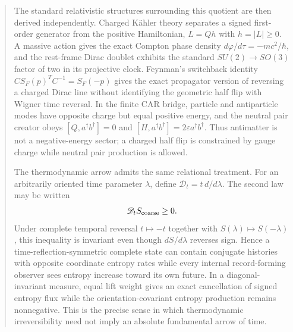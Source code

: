 \documentclass[11pt]{article}
\theoremstyle{definition}\newtheorem{definition}[theorem]{Definition}
\theoremstyle{remark}\newtheorem{remark}[theorem]{Remark}\newtheorem{conjecture}[theorem]{Conjecture}
\begin{document}
\begin{abstract}
The standard relativistic structures surrounding this quotient are then derived independently. Charged K\"ahler theory separates a signed first-order generator from the positive Hamiltonian, $L=Qh$ with $h=|L|\ge0$. A massive action gives the exact Compton phase density $d\varphi/d\tau=-mc^2/\hbar$, and the rest-frame Dirac doublet exhibits the standard $SU(2)\to SO(3)$ factor of two in its projective clock. Feynman's switchback identity $CS_F(p)^TC^{-1}=S_F(-p)$ gives the exact propagator version of reversing a charged Dirac line without identifying the geometric half flip with Wigner time reversal. In the finite CAR bridge, particle and antiparticle modes have opposite charge but equal positive energy, and the neutral pair creator obeys $[Q,a^\dagger b^\dagger]=0$ and $[H,a^\dagger b^\dagger]=2\varepsilon a^\dagger b^\dagger$. Thus antimatter is not a negative-energy sector; a charged half flip is constrained by gauge charge while neutral pair production is allowed.

The thermodynamic arrow admits the same relational treatment. For an arbitrarily oriented time parameter $\lambda$, define $\mathscr D_t=t\,d/d\lambda$. The second law may be written
\begin{equation*}
 \mathscr D_tS_{\rm coarse}\ge0.
\end{equation*}
Under complete temporal reversal $t\mapsto-t$ together with $S(\lambda)\mapsto S(-\lambda)$, this inequality is invariant even though $dS/d\lambda$ reverses sign. Hence a time-reflection-symmetric complete state can contain conjugate histories with opposite coordinate entropy rates while every internal record-forming observer sees entropy increase toward its own future. In a diagonal-invariant measure, equal lift weight gives an exact cancellation of signed entropy flux while the orientation-covariant entropy production remains nonnegative. This is the precise sense in which thermodynamic irreversibility need not imply an absolute fundamental arrow of time.


\end{abstract}
\end{document}
